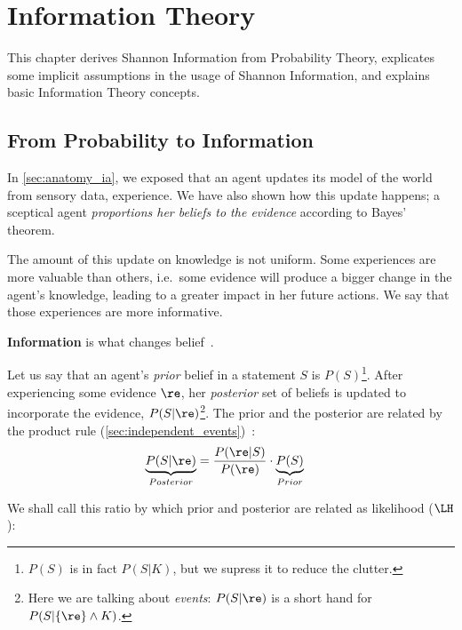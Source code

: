 \chapter{Information Theory}\label{ch:information}


This chapter derives Shannon Information from Probability Theory, explicates some implicit assumptions in the usage of Shannon Information, and explains basic Information Theory concepts.


\section{From Probability to Information}\label{sec:prob2info}
In \cref{sec:anatomy_ia}, we exposed that an agent updates its model of the world from sensory data, experience. We have also shown how this update happens; a sceptical agent \emph{proportions her beliefs to the evidence} according to Bayes' theorem.

The amount of this update on knowledge is not uniform. Some experiences are more valuable than others, i.e.\ some evidence will produce a bigger change in the agent's knowledge, leading to a greater impact in her future actions. We say that those experiences are more informative.
\begin{definition}\label{def:information}
	\textbf{Information} is what changes belief~\cite{sowinski:2016,caticha:2008}.
\end{definition}

Let us say that an agent's \emph{prior} belief in a statement \(S\) is \(P(S) \)\footnote{\(P(S) \) is in fact \(P(S|K) \), but we supress it to reduce the clutter.}. After experiencing some evidence \(\re\), her \emph{posterior} set of beliefs is updated to incorporate the evidence, \(P(S|\re )\)\footnote{Here we are talking about \emph{events}: \(P(S|\re )\) is a short hand for \(P(S|\{\re\} \land K )\).}. The prior and the posterior are related by the product rule (\cref{sec:independent_events})~\cite{sowinski:2016}:
\begin{align}
	\underbrace{P(S|\re)}_{Posterior}&= \frac{P(\re | S )}{P(\re)}\cdot \underbrace{P(S)}_{Prior}
\end{align}

We shall call this ratio by which prior and posterior are related as likelihood (\(\LH\)):

